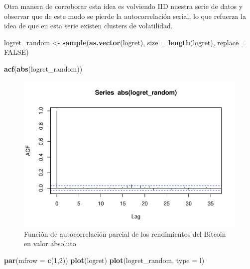 \documentclass[
]{book}
\newenvironment{Shaded}{\begin{snugshade}}{\end{snugshade}}
\newcommand{\AttributeTok}[1]{\textcolor[rgb]{0.13,0.29,0.53}{#1}}
\newcommand{\ConstantTok}[1]{\textcolor[rgb]{0.56,0.35,0.01}{#1}}
\newcommand{\DecValTok}[1]{\textcolor[rgb]{0.00,0.00,0.81}{#1}}
\newcommand{\FunctionTok}[1]{\textcolor[rgb]{0.13,0.29,0.53}{\textbf{#1}}}
\newcommand{\NormalTok}[1]{#1}
\newcommand{\OtherTok}[1]{\textcolor[rgb]{0.56,0.35,0.01}{#1}}
\newcommand{\StringTok}[1]{\textcolor[rgb]{0.31,0.60,0.02}{#1}}
\begin{document}
Otra manera de corroborar esta idea es volviendo IID nuestra serie de datos y observar que de este modo se pierde la autocorrelación serial, lo que refuerza la idea de que en esta serie existen clusters de volatilidad.

\begin{Shaded}
\begin{Highlighting}[]
\NormalTok{logret\_random }\OtherTok{\textless{}{-}} \FunctionTok{sample}\NormalTok{(}\FunctionTok{as.vector}\NormalTok{(logret), }\AttributeTok{size =}  \FunctionTok{length}\NormalTok{(logret), }\AttributeTok{replace =} \ConstantTok{FALSE}\NormalTok{)}

\FunctionTok{acf}\NormalTok{(}\FunctionTok{abs}\NormalTok{(logret\_random))}
\end{Highlighting}
\end{Shaded}

\begin{figure}

{\centering \includegraphics{Notas-Series-Tiempo_files/figure-latex/fig108-1} 

}

\caption{Función de autocorrelación parcial de los rendimientos del Bitcoin en valor absoluto}\label{fig:fig108}
\end{figure}

\begin{Shaded}
\begin{Highlighting}[]
\FunctionTok{par}\NormalTok{(}\AttributeTok{mfrow =} \FunctionTok{c}\NormalTok{(}\DecValTok{1}\NormalTok{,}\DecValTok{2}\NormalTok{))}
\FunctionTok{plot}\NormalTok{(logret)}
\FunctionTok{plot}\NormalTok{(logret\_random, }\AttributeTok{type =} \StringTok{\textquotesingle{}l\textquotesingle{}}\NormalTok{)}
\end{Highlighting}
\end{Shaded}
\end{document}
